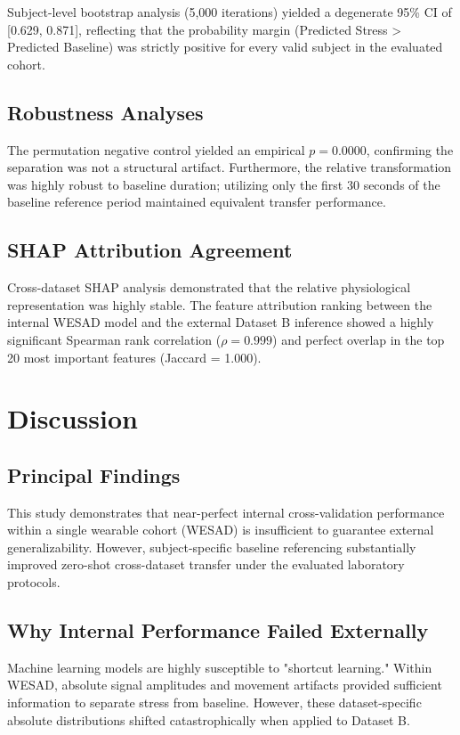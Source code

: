 \documentclass[journal]{IEEEtran}
\begin{document}
Subject-level bootstrap analysis (5,000 iterations) yielded a degenerate 95\% CI of [0.629, 0.871], reflecting that the probability margin (Predicted Stress > Predicted Baseline) was strictly positive for every valid subject in the evaluated cohort. 

\subsection{Robustness Analyses}
The permutation negative control yielded an empirical $p = 0.0000$, confirming the separation was not a structural artifact. Furthermore, the relative transformation was highly robust to baseline duration; utilizing only the first 30 seconds of the baseline reference period maintained equivalent transfer performance. 

\subsection{SHAP Attribution Agreement}
Cross-dataset SHAP analysis demonstrated that the relative physiological representation was highly stable. The feature attribution ranking between the internal WESAD model and the external Dataset B inference showed a highly significant Spearman rank correlation ($\rho = 0.999$) and perfect overlap in the top 20 most important features (Jaccard = 1.000). 

\section{Discussion}

\subsection{Principal Findings}
This study demonstrates that near-perfect internal cross-validation performance within a single wearable cohort (WESAD) is insufficient to guarantee external generalizability. However, subject-specific baseline referencing substantially improved zero-shot cross-dataset transfer under the evaluated laboratory protocols.

\subsection{Why Internal Performance Failed Externally}
Machine learning models are highly susceptible to "shortcut learning." Within WESAD, absolute signal amplitudes and movement artifacts provided sufficient information to separate stress from baseline. However, these dataset-specific absolute distributions shifted catastrophically when applied to Dataset B.
\end{document}
